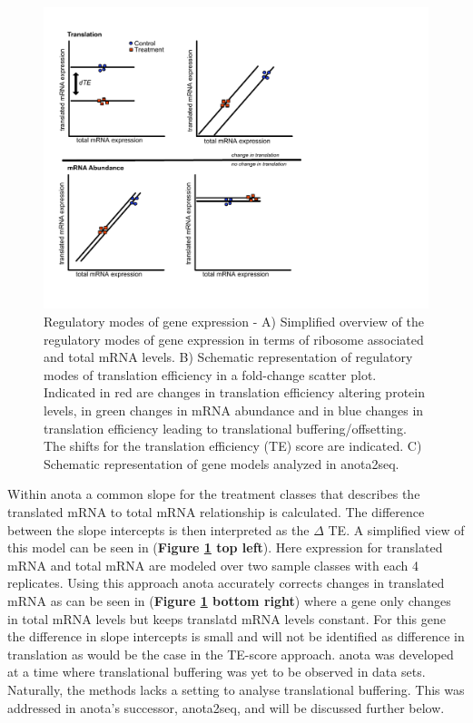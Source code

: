 \documentclass[12pt,openany]{book}
\begin{document}
\begin{figure}
  \includegraphics{./figures/geneModes_anota_Larsson.pdf}
  \caption{Regulatory modes of gene expression - A) Simplified overview of the regulatory modes of gene expression in terms of ribosome associated and total mRNA levels. B) Schematic representation of regulatory modes of translation efficiency in a fold-change scatter plot. Indicated in red are changes in translation efficiency altering protein levels, in green changes in mRNA abundance and in blue changes in translation efficiency leading to translational buffering/offsetting. The shifts for the translation efficiency (TE) score are indicated. C) Schematic representation of gene models analyzed in anota2seq. \label{fig:anota}}
\end{figure}

Within anota a common slope for the treatment classes that describes the
translated mRNA to total mRNA relationship is calculated. The difference
between the slope intercepts is then interpreted as the \(\varDelta\)
TE. A simplified view of this model can be seen in (\textbf{Figure
\ref{fig:anota} top left}). Here expression for translated mRNA and
total mRNA are modeled over two sample classes with each 4 replicates.
Using this approach anota accurately corrects changes in translated mRNA
as can be seen in (\textbf{Figure \ref{fig:anota} bottom right}) where a
gene only changes in total mRNA levels but keeps translatd mRNA levels
constant. For this gene the difference in slope intercepts is small and
will not be identified as difference in translation as would be the case
in the TE-score approach. anota was developed at a time where
translational buffering was yet to be observed in data sets. Naturally,
the methods lacks a setting to analyse translational buffering. This was
addressed in anota's successor, anota2seq, and will be discussed further
below.
\end{document}
